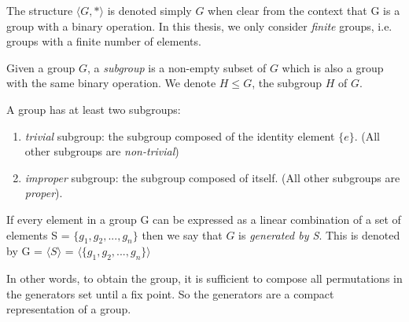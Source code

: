 The structure $\langle G, * \rangle$ is denoted simply $G$ when clear from the context that G is a group
with a binary operation. In this thesis, we only consider \emph{finite} groups, i.e. groups with a finite number of elements.
\begin{definition}[Subgroup]
Given a group $G$, a \emph{subgroup} is a non-empty subset of $G$ which is also a group with 
the same binary operation. We denote $H \leq G$, the subgroup $H$ of $G$.
\end{definition}
A group has at least two subgroups: 
\begin{enumerate}[topsep=0pt,nolistsep]
 \item \emph{trivial} subgroup: the subgroup composed of the identity element $\{e\}$. (All other subgroups are \textit{non-trivial})
 \item \emph{improper} subgroup: the subgroup composed of itself. (All other subgroups are \emph{proper}).
\end{enumerate}
\begin{definition}
 If every element in a group G can be expressed as a linear combination
 of a set of elements S = $\{g_1, g_2, ..., g_n \}$ then we say that $G$ is 
 \textit{generated by S}. This is denoted by G = $\langle S \rangle$ =
 $\langle \{g_1, g_2, ..., g_n \} \rangle$ 
\end{definition}
In other words, to obtain the group, it is sufficient to compose all permutations in the generators set until a fix point.
So the generators are a compact representation of a group.
